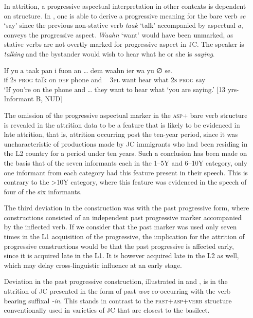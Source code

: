 \documentclass[output=paper,colorlinks,citecolor=brown]{langscibook}
\begin{document}
In attrition, a progressive aspectual interpretation in other contexts is dependent on structure. In , one is able to derive a progressive meaning for the bare verb \textit{se} ‘say’ since the previous non-stative verb \textit{taak} ‘talk’ accompanied by aspectual \textit{a}, conveys the progressive aspect. \textit{Waahn} ‘want’ would have been unmarked, as stative verbs are not overtly marked for progressive aspect in JC. The speaker is \textit{talking} and the bystander would wish to hear what he or she is \textit{saying}.

\ea \label{bkm:messamK:33}
\gll  If yu   a  taak pan i fuon    an … dem  waahn ier   wa  yu  ∅ se.\\
if 2\textsc{s}   \textsc{prog}  talk  on    \textsc{def} phone  and ~  3\textsc{pl}    want   hear what 2\textsc{s}  \textsc{prog} say\\
\glt `If you’re on the phone and … they want to hear what ‘you are saying.’
                       [13 yrs- Informant B, NUD]
\z


The omission of the progressive aspectual marker in the \textsc{asp}+ bare verb structure is revealed in the attrition data to be a feature that is likely to be evidenced in late attrition, that is, attrition occurring post the ten-year period, since it was uncharacteristic of productions made by JC immigrants who had been residing in the L2 country for a period under ten years. Such a conclusion has been made on the basis that of the seven informants each in the 1--5Y and 6--10Y category, only one informant from each category had this feature present in their speech. This is contrary to the >10Y category, where this feature was evidenced in the speech of four of the six informants.

The third deviation in the construction was with the past progressive form, where constructions consisted of an independent past progressive marker accompanied by the inflected verb. If we consider that the past marker was used only seven times in the L1 acquisition of the progressive, the implication for the attrition of progressive constructions would be that the past progressive is affected early, since it is acquired late in the L1. It is however acquired late in the L2 as well, which may delay cross-linguistic influence at an early stage.

Deviation in the past progressive construction, illustrated in  and , is in the attrition of JC presented in the form of past \textit{woz} co-occurring with the verb bearing suffixal \textit{{}-in}. This stands in contrast to the \textsc{past+asp+verb} structure conventionally used in varieties of JC that are closest to the basilect.
\end{document}
